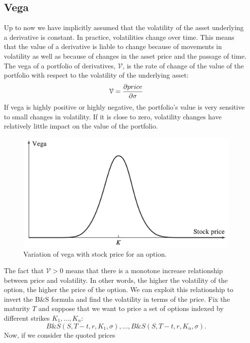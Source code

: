 \subsection{Vega}
Up to now we have implicitly assumed that the volatility of the asset underlying a derivative is constant. In practice, volatilities change over time. This means that the value of a derivative is liable to change because of movements in volatility as well as because of changes in the asset price and the passage of time.\\
The vega of a portfolio of derivatives, $\mathcal{V}$, is the rate of change of the value of the portfolio with respect to the volatility of the underlying asset:
\begin{equation}
    \mathcal{V} = \pdv{price}{\sigma} 
\end{equation}
If vega is highly positive or highly negative, the portfolio’s value is very sensitive to small changes in volatility. If it is close to zero, volatility changes have relatively little impact on the value of the portfolio.
\begin{figure}[htp]
    \centering
    \includegraphics[scale=0.2]{fig/tmp/fig17.png}
    \caption{Variation of vega with stock price for an option.}
    \label{fig:vega}
\end{figure}
\newline The fact that $\mathcal{V}>0$ means that there is a monotone increase relationship between price and volatility. In other words, the higher the volatility of the option, the higher the price of the option. We can exploit this relationship to invert the B\&S formula and find the volatility in terms of the price. Fix the maturity $T$ and suppose that we want to price a set of options indexed by different strikes $K_1,\dots,K_n$: $$B\&S(S,T-t,r,K_1,\sigma),\dots,B\&S(S,T-t,r,K_n,\sigma).$$ 
Now, if we consider the quoted prices
